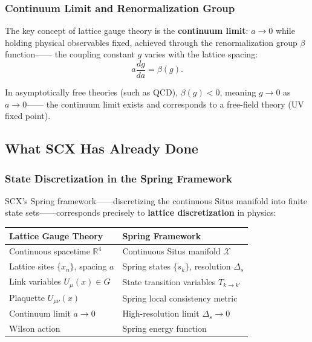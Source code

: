 \documentclass[12pt,a4paper]{article}
\theoremstyle{remark}
\newcommand{\R}{\mathbb{R}}
\begin{document}
\subsubsection{Continuum Limit and Renormalization Group}

The key concept of lattice gauge theory is the \textbf{continuum limit}: $a \to 0$ while holding physical
observables fixed, achieved through the renormalization group $\beta$ function——
the coupling constant $g$ varies with the lattice spacing:
\begin{equation}
    a\frac{dg}{da} = \beta(g).
\end{equation}

In asymptotically free theories (such as QCD), $\beta(g) < 0$, meaning $g \to 0$ as $a \to 0$——
the continuum limit exists and corresponds to a free-field theory (UV fixed point).

\subsection{What SCX Has Already Done}

\subsubsection{State Discretization in the Spring Framework}

SCX's Spring framework——discretizing the continuous Situs manifold into
finite state sets——corresponds precisely to \textbf{lattice discretization} in physics:

\begin{center}
\begin{tabular}{p{5cm} p{5cm}}
\toprule
\textbf{Lattice Gauge Theory} & \textbf{Spring Framework} \\
\midrule
Continuous spacetime $\R^4$ & Continuous Situs manifold $\mathcal{X}$ \\
Lattice sites $\{x_n\}$, spacing $a$ & Spring states $\{s_k\}$, resolution $\Delta_s$ \\
Link variables $U_\mu(x) \in G$ & State transition variables $T_{k\to k'}$ \\
Plaquette $U_{\mu\nu}(x)$ & Spring local consistency metric \\
Continuum limit $a \to 0$ & High-resolution limit $\Delta_s \to 0$ \\
Wilson action & Spring energy function \\
\bottomrule
\end{tabular}
\end{center}
\end{document}
